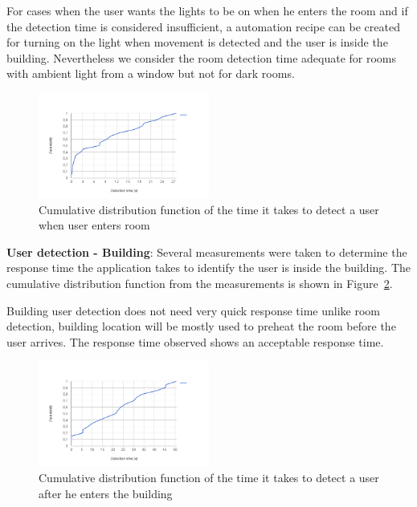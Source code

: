 \documentclass[conference]{IEEEtran}
\begin{document}
For cases when the user wants the lights to be on when he enters the room and if the detection time is considered insufficient, a automation recipe can be created for turning on the light when movement is detected and the user is inside the building. Nevertheless we consider the room detection time adequate for rooms with ambient light from a window but not for dark rooms.


\begin{figure}[]
\centering
\includegraphics[width=0.5\textwidth]{Figures/room_detection_cumulative2}
\caption{Cumulative distribution function of the time it takes to detect a user when user enters room}
\label{eval:room2}
\end{figure}


\textbf{User detection - Building}: Several measurements were taken to determine the response time the application takes to identify the user is inside the building. The cumulative distribution function from the measurements is shown in Figure~\ref{eval:building1}.

Building user detection does not need very quick response time unlike room detection, building location will be mostly used to preheat the room before the user arrives. The response time observed shows an acceptable response time.


\begin{figure}[]
\centering
\includegraphics[width=0.5\textwidth]{Figures/building_detection_cumulative}
\caption{Cumulative distribution function of the time it takes to detect a user  after he enters the building}
\label{eval:building1}
\end{figure}
\end{document}
